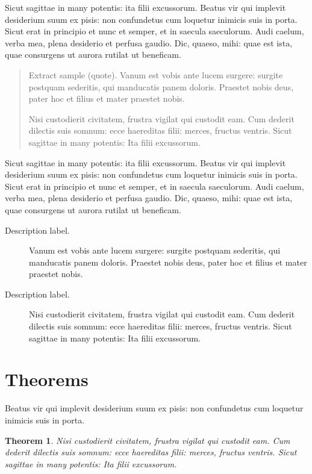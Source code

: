 \documentclass[numbers,compress]{vmsta}
\newtheorem{thm}{Theorem}
\theoremstyle{definition}
\begin{document}
Sicut sagittae in many potentis: ita filii excussorum. Beatus vir qui
implevit desi\-derium suum ex pisis: non confundetus cum loquetur inimicis
suis in porta.  Sicut erat in principio et nunc et semper, et in saecula
saeculorum. Audi caelum, verba mea, plena desiderio et perfusa gaudio.
Dic, quaeso, mihi: quae est ista, quae consurgens ut aurora rutilat ut
beneficam.

\begin{quote}
Extract sample (quote). Vanum est vobis ante lucem surgere: surgite postquam
sederitis, qui manducatis panem doloris. Praestet nobis deus, pater
hoc et filius et mater praestet nobis.

Nisi custodierit civitatem,
frustra vigilat qui custodit eam. Cum dederit dilectis suis somnum:
ecce haereditas filii: merces, fructus ventris. Sicut sagittae in
many potentis: Ita filii excussorum.
\end{quote}

Sicut sagittae in many potentis: ita filii excussorum. Beatus vir qui
implevit desiderium suum ex pisis: non confundetus cum loquetur inimicis
suis in porta.  Sicut erat in principio et nunc et semper, et in saecula
saeculorum. Audi caelum, verba mea, plena desiderio et perfusa gaudio.
Dic, quaeso, mihi: quae est ista, quae consurgens ut aurora rutilat ut
beneficam.

\begin{description}
\item[Description label.] Vanum est vobis ante lucem surgere: surgite postquam
sederitis, qui manducatis panem doloris. Praestet nobis deus, pater
hoc et filius et mater praestet nobis.

\item[Description label.] Nisi custodierit civitatem,
frustra vigilat qui custodit eam. Cum dederit dilectis suis somnum:
ecce haereditas filii: merces, fructus ventris. Sicut sagittae in
many potentis: Ita filii excussorum.
\end{description}


\section{Theorems}

Beatus vir qui implevit desiderium
suum ex pisis: non confundetus cum loquetur inimicis suis in porta.

\begin{thm}
Nisi custodierit civitatem,
frustra vigilat qui custodit eam. Cum dederit dilectis suis somnum:
ecce haereditas filii: merces, fructus ventris. Sicut sagittae in
many potentis: Ita filii excussorum.
\end{thm}
\end{document}
